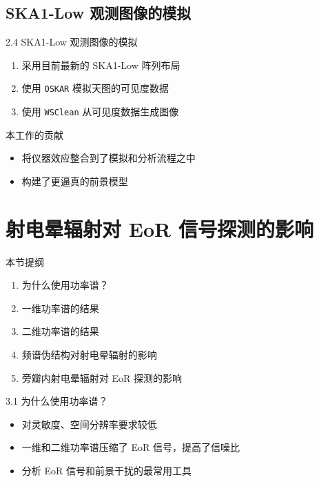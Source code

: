 \documentclass{beamer}
\begin{document}
\subsection{SKA1-Low 观测图像的模拟}

\begin{frame}{2.4 SKA1-Low 观测图像的模拟}
  \begin{enumerate}
    \item 采用目前最新的 \alert{SKA1-Low 阵列布局}
    \item 使用 \texttt{OSKAR} 模拟天图的\alert{可见度数据}
    \item 使用 \texttt{WSClean} 从可见度数据生成图像
  \end{enumerate}

  \begin{alertblock}{本工作的贡献}
    \begin{itemize}
      \item 将仪器效应整合到了模拟和分析流程之中
      \item 构建了更逼真的前景模型
    \end{itemize}
  \end{alertblock}
\end{frame}


\section{射电晕辐射对 EoR 信号探测的影响}

\begin{frame}
  \begin{block}{本节提纲}
  \begin{enumerate}
    \item 为什么使用功率谱？
    \item 一维功率谱的结果
    \item 二维功率谱的结果
    \item 频谱伪结构对射电晕辐射的影响
    \item 旁瓣内射电晕辐射对 EoR 探测的影响
  \end{enumerate}
  \end{block}
\end{frame}

\begin{frame}{3.1 为什么使用功率谱？}
  \begin{itemize}
    \item 对灵敏度、空间分辨率要求较低
    \item 一维和二维功率谱压缩了 EoR 信号，提高了信噪比
    \item 分析 EoR 信号和前景干扰的最常用工具
  \end{itemize}
\end{frame}
\end{document}
